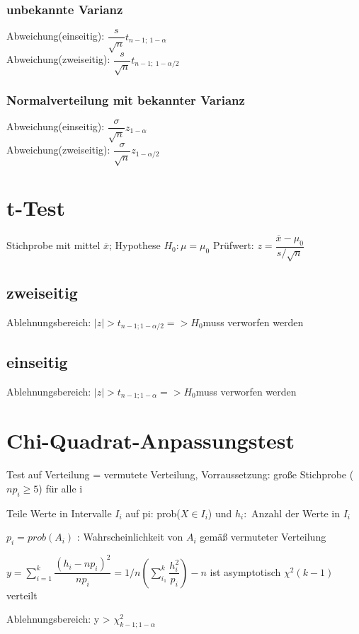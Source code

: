 \subsubsection*{unbekannte Varianz}
Abweichung(einseitig): $\dfrac{s}{\sqrt{n}} t_{n-1;~ 1-\alpha}$\\
Abweichung(zweiseitig): $\dfrac{s}{\sqrt{n}} t_{n-1;~ 1-\alpha/2}$

\subsubsection*{Normalverteilung mit bekannter Varianz}
Abweichung(einseitig): $\dfrac{\sigma}{\sqrt{n}} z_{1-\alpha}$\\
Abweichung(zweiseitig): $\dfrac{\sigma}{\sqrt{n}} z_{1-\alpha/2}$


\section*{t-Test}
Stichprobe mit mittel $\overline{x}$; Hypothese $H_0: \mu = \mu_0$
Prüfwert: $z= \dfrac{\overline{x} - \mu_0}{s/\sqrt{n}}$

\subsection*{zweiseitig}
Ablehnungsbereich: $|z| > t_{n-1;1-\alpha/2} => H_0 $muss verworfen werden 
\subsection*{einseitig}
Ablehnungsbereich: $|z| > t_{n-1;1-\alpha} => H_0 $muss verworfen werden 


\section*{Chi-Quadrat-Anpassungstest}
Test auf Verteilung = vermutete Verteilung, Vorraussetzung: große Stichprobe ($np_i \geq 5$) für alle i

Teile Werte in Intervalle $I_i$ auf  pi: prob($X \in I_i$) und $h_i:$ Anzahl der Werte in $I_i$

$p_i = prob(A_i)$ : Wahrscheinlichkeit von $A_i$ gemäß vermuteter Verteilung

$y = \sum_{i=1}^k \dfrac{(h_i -np_i)^2}{n p_i} = 1/n \left( \sum_{i_1}^k \dfrac{h_i^2}{p_i} \right) -n $
ist asymptotisch  $\chi^2 (k-1)$ verteilt 

Ablehnungsbereich: y > $\chi^2_{k-1;1-\alpha}$